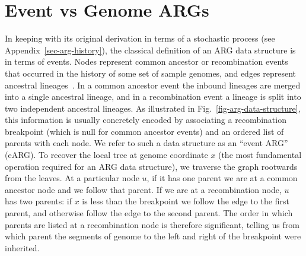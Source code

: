 \documentclass{article}
\begin{document}
\section*{Event vs Genome ARGs}\label{eARG}
In keeping with its original derivation in terms of a stochastic
process (see Appendix~\ref{sec-arg-history}), the classical definition of an
ARG data structure is
in terms of events.
Nodes represent
common ancestor or recombination events that occurred in the
history of some set of sample genomes, and edges represent ancestral
lineages~\citep{griffiths1996ancestral}.
In a common ancestor event the inbound lineages are merged into a
single ancestral lineage, and in a recombination
event a lineage is split into two independent
ancestral lineages.
As illustrated in Fig.~\ref{fig-arg-data-structure}, this information
is usually concretely encoded by associating a recombination breakpoint
(which is null for common ancestor events) and an ordered list of parents
with each node. We refer to such a  data structure as an
``event ARG'' (eARG).
To recover the local tree at genome coordinate $x$ (the most
fundamental operation required for an ARG data structure),
we traverse the graph rootwards from the leaves.
At a particular
node $u$, if it has one parent we are at a common ancestor
node and we follow that parent. If we are at a
recombination node, $u$ has two parents: if
$x$ is less than the breakpoint we follow
the edge to the first parent, and otherwise follow the edge
to the second parent.
The order in which parents are listed at a recombination node is
therefore significant, telling us
from which parent the segments of genome to the left and right of the breakpoint
were inherited.

\end{document}
